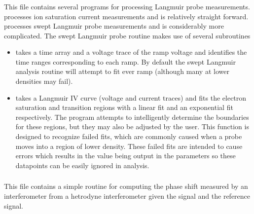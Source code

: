 \subsubsection{}

This file contains several programs for processing Langmuir probe measurements.  processes ion saturation current measurements and is relatively straight forward.  processes swept Langmuir probe measurements and is considerably more complicated. The swept Langmuir probe routine makes use of several subroutines

\begin{itemize}

\item {} takes a time array and a voltage trace of the ramp voltage and identifies the time ranges corresponding to each ramp. By default the swept Langmuir analysis routine will attempt to fit ever ramp (although many at lower densities may fail). 

\item {} takes a Langmuir IV curve (voltage and current traces) and fits the electron saturation and transition regions with a linear fit and an exponential fit respectively. The program attempts to intelligently determine the boundaries for these regions, but they may also be adjusted by the user. This function is designed to recognize failed fits, which are commonly caused when a probe moves into a region of lower density. These failed fits are intended to cause errors which results in the value  being output in the parameters so these datapoints can be easily ignored in analysis.


\end{itemize}


\subsubsection{}

This file contains a simple routine for computing the phase shift measured by an interferometer from a hetrodyne interferometer given the signal and the reference signal. 

